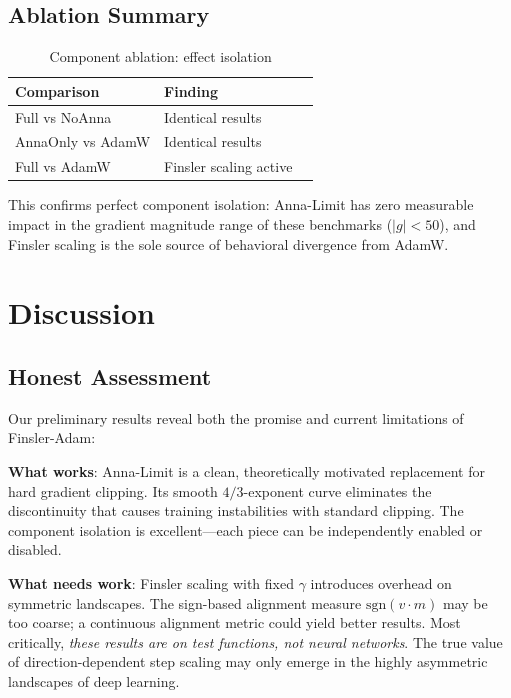 \documentclass[11pt,a4paper,twocolumn]{article}
\begin{document}
\subsection{Ablation Summary}

\begin{table}[h]
\centering
\caption{Component ablation: effect isolation}
\label{tab:ablation}
\small
\begin{tabular}{@{}lll@{}}
\toprule
Comparison & Finding \\
\midrule
Full vs NoAnna & Identical results \\
AnnaOnly vs AdamW & Identical results \\
Full vs AdamW & Finsler scaling active \\
\bottomrule
\end{tabular}
\end{table}

This confirms perfect component isolation: Anna-Limit has zero measurable impact in the gradient magnitude range of these benchmarks ($|g| < 50$), and Finsler scaling is the sole source of behavioral divergence from AdamW.

\section{Discussion}

\subsection{Honest Assessment}

Our preliminary results reveal both the promise and current limitations of Finsler-Adam:

\textbf{What works}: Anna-Limit is a clean, theoretically motivated replacement for hard gradient clipping. Its smooth $4/3$-exponent curve eliminates the discontinuity that causes training instabilities with standard clipping. The component isolation is excellent---each piece can be independently enabled or disabled.

\textbf{What needs work}: Finsler scaling with fixed $\gamma$ introduces overhead on symmetric landscapes. The sign-based alignment measure $\text{sgn}(v \cdot m)$ may be too coarse; a continuous alignment metric could yield better results. Most critically, \emph{these results are on test functions, not neural networks}. The true value of direction-dependent step scaling may only emerge in the highly asymmetric landscapes of deep learning.
\end{document}
